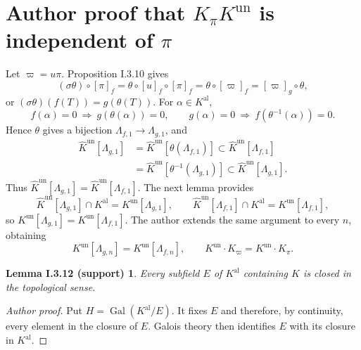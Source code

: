 \documentclass[11pt]{article}
\newcommand{\un}{\mathrm{un}}
\newcommand{\al}{\mathrm{al}}
\newcommand{\Gal}{\operatorname{Gal}}
\newcommand{\Khat}{\widehat K^{\un}}
\newtheorem*{closedfield}{Lemma I.3.12 (support)}
\begin{document}
\section*{Author proof that $K_\pi K^{\un}$ is independent of $\pi$}
Let $\varpi=u\pi$. Proposition I.3.10 gives
\[
 (\sigma\theta)\circ[\pi]_f
 =\theta\circ[u]_f\circ[\pi]_f
 =\theta\circ[\varpi]_f=[\varpi]_g\circ\theta,
\]
or $(\sigma\theta)(f(T))=g(\theta(T))$.
For $\alpha\in K^{\al}$,
\[
 f(\alpha)=0\ \Longrightarrow\ g(\theta(\alpha))=0,
 \qquad
 g(\alpha)=0\ \Longrightarrow\ f(\theta^{-1}(\alpha))=0.
\]
Hence $\theta$ gives a bijection $\Lambda_{f,1}\longrightarrow\Lambda_{g,1}$, and
\begin{align*}
 \Khat[\Lambda_{g,1}]
 &=\Khat[\theta(\Lambda_{f,1})]
 \subset\Khat[\Lambda_{f,1}]\\
 &=\Khat[\theta^{-1}(\Lambda_{g,1})]
 \subset\Khat[\Lambda_{g,1}].
\end{align*}
Thus $\Khat[\Lambda_{g,1}]=\Khat[\Lambda_{f,1}]$.
The next lemma provides
\[
 \Khat[\Lambda_{g,1}]\cap K^{\al}=K^{\un}[\Lambda_{g,1}],\qquad
 \Khat[\Lambda_{f,1}]\cap K^{\al}=K^{\un}[\Lambda_{f,1}],
\]
so $K^{\un}[\Lambda_{g,1}]=K^{\un}[\Lambda_{f,1}]$.
The author extends the same argument to every $n$, obtaining
\[
 K^{\un}[\Lambda_{g,n}]=K^{\un}[\Lambda_{f,n}],\qquad
 K^{\un}\cdot K_\varpi=K^{\un}\cdot K_\pi.
\]

\begin{closedfield}
Every subfield $E$ of $K^{\al}$ containing $K$ is closed in the topological sense.
\end{closedfield}
\begin{proof}[Author proof]
Put $H=\Gal(K^{\al}/E)$. It fixes $E$ and therefore, by continuity, every element
in the closure of $E$. Galois theory then identifies $E$ with its closure in $K^{\al}$.
\end{proof}

\end{document}
